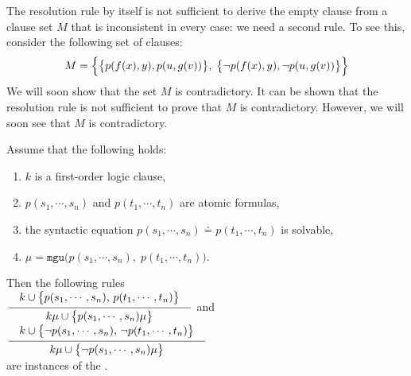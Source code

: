 The resolution rule by itself is not sufficient to derive the empty clause from a clause set $M$ that is
inconsistent in every case: we need a second rule. To see this, consider the following set of clauses:
\[ M = \Bigl\{ \bigl\{p(f(x),y), p(u,g(v))\bigr\},\; 
               \bigl\{\neg p(f(x),y), \neg p(u,g(v))\bigr\} \Bigr\} 
\]
We will soon show that the set $M$ is contradictory. It can be shown that the resolution rule is not
sufficient to prove that $M$ is contradictory.
However, we will soon see that $M$ is contradictory. 

\begin{Definition} 
  Assume that the following holds:
  \begin{enumerate}
  \item $k$ is a first-order logic clause,
  \item $p(s_1,\cdots,s_n)$ and $p(t_1,\cdots,t_n)$ are atomic formulas,
  \item the syntactic equation $p(s_1,\cdots,s_n) \doteq p(t_1,\cdots,t_n)$ is solvable,
  \item $\mu = \mathtt{mgu}\bigl(p(s_1,\cdots,s_n),\; p(t_1,\cdots,t_n)\bigr)$.
  \end{enumerate}
  Then the following rules \\[0.3cm]
  \hspace*{0.8cm}
  $\schluss{k \cup \bigl\{p(s_1,\cdots,s_n),\, p(t_1,\cdots,t_n)\bigl\}}{k\mu \cup \bigl\{p(s_1,\cdots,s_n)\mu\bigr\} }$ 
  \quad and \quad
  $\schluss{k \cup \bigl\{ \neg p(s_1,\cdots,s_n),\, \neg p(t_1,\cdots,t_n)\bigl\}}{k\mu \cup \bigl\{\neg p(s_1,\cdots,s_n)\mu\bigr\} }$ 
  \\[0.3cm]
  are instances of the .
  \eox
\end{Definition}

